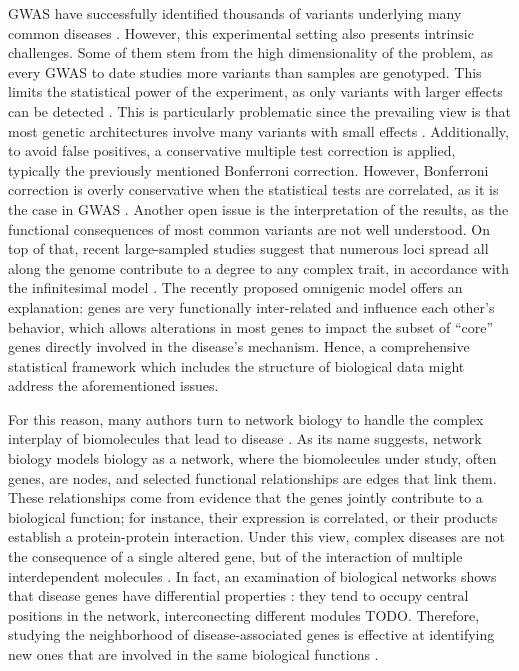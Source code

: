 \documentclass[10pt,letterpaper]{article}
\begin{document}
GWAS have successfully identified thousands of variants underlying many common diseases \cite{buniello_nhgri-ebi_2019}. However, this experimental setting also presents intrinsic challenges. Some of them stem from the high dimensionality of the problem, as every GWAS to date studies more variants than samples are genotyped. This limits the statistical power of the experiment, as only variants with larger effects can be detected \cite{visscher_10_2017}. This is particularly problematic since the prevailing view is that most genetic architectures involve many variants with small effects \cite{visscher_10_2017}. Additionally, to avoid false positives, a conservative multiple test correction is applied, typically the previously mentioned Bonferroni correction. However, Bonferroni correction is overly conservative when the statistical tests are correlated, as it is the case in GWAS \cite{wang_statistical_2018}. Another open issue is the interpretation of the results, as the functional consequences of most common variants are not well understood. On top of that, recent large-sampled studies suggest that numerous loci spread all along the genome contribute to a degree to any complex trait, in accordance with the infinitesimal model \cite{barton_infinitesimal_2017}. The recently proposed omnigenic model \cite{boyle_expanded_2017} offers an explanation: genes are very functionally inter-related and influence each other's behavior, which allows alterations in most genes to impact the subset of ``core'' genes directly involved in the disease's mechanism. Hence, a comprehensive statistical framework which includes the structure of biological data might address the aforementioned issues.

For this reason, many authors turn to network biology to handle the complex interplay of biomolecules that lead to disease \cite{furlong_human_2013}. As its name suggests, network biology models biology as a network, where the biomolecules under study, often genes, are nodes, and selected functional relationships are edges that link them. These relationships come from evidence that the genes jointly contribute to a biological function; for instance, their expression is correlated, or their products establish a protein-protein interaction. Under this view, complex diseases are not the consequence of a single altered gene, but of the interaction of multiple interdependent molecules \cite{barabasi_network_2011}. In fact, an examination of biological networks shows that disease genes have differential properties \cite{barabasi_network_2011,pinero_uncovering_2016}: they tend to occupy central positions in the network, interconecting different modules TODO. Therefore, studying the neighborhood of disease-associated genes is effective at identifying new ones that are involved in the same biological functions \cite{huang_systematic_2018}. 
\end{document}
